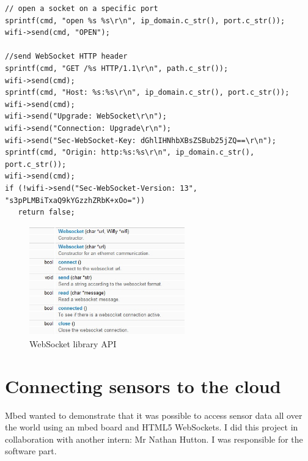 \documentclass[pdftex,10pt,a4paper]{report}
\begin{document}
\begin{center}
\begin{lstlisting}[label=Connection to a WebSocket server,caption=Connection to a WebSocket server]
// open a socket on a specific port
sprintf(cmd, "open %s %s\r\n", ip_domain.c_str(), port.c_str());
wifi->send(cmd, "OPEN");

//send WebSocket HTTP header
sprintf(cmd, "GET /%s HTTP/1.1\r\n", path.c_str());
wifi->send(cmd);
sprintf(cmd, "Host: %s:%s\r\n", ip_domain.c_str(), port.c_str());
wifi->send(cmd);
wifi->send("Upgrade: WebSocket\r\n");
wifi->send("Connection: Upgrade\r\n");
wifi->send("Sec-WebSocket-Key: dGhlIHNhbXBsZSBub25jZQ==\r\n");
sprintf(cmd, "Origin: http:%s:%s\r\n", ip_domain.c_str(), port.c_str());
wifi->send(cmd);
if (!wifi->send("Sec-WebSocket-Version: 13", "s3pPLMBiTxaQ9kYGzzhZRbK+xOo="))
   return false;

\end{lstlisting}
\end{center}

\begin{figure}[h!]
		\centering
		\includegraphics[width=0.6\textwidth]{./ws_api.jpg}
		\caption{WebSocket library API}
		\label{WebSocket library API}
\end{figure}




\newpage









\section{Connecting sensors to the cloud}
Mbed wanted to demonstrate that it was possible to access sensor data all over the world using an mbed board and HTML5 WebSockets. I did this project in collaboration with another intern: Mr Nathan Hutton. I was responsible for the software part. \\
\end{document}
